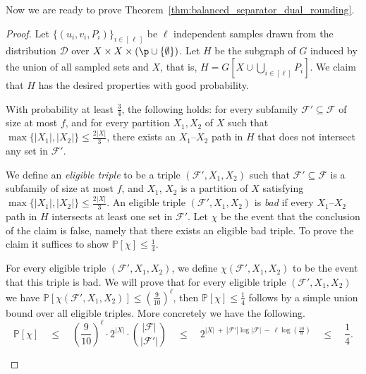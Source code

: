 Now we are ready to prove Theorem~\ref{thm:balanced_separator_dual_rounding}.

\BalancedSeparatorDualRounding*
\begin{proof}
    Let $\{(u_i, v_i, P_i)\}_{i\in[\,\ell\,]}$ be $\ell$ independent samples drawn from the distribution $\mathcal{D}$ over $X\times X\times (\p \cup \{\emptyset\})$. Let $H$ be the subgraph of $G$ induced by the union of all sampled sets and $X$, that is, $H = G[X\cup\bigcup_{i \in [\ell]} P_i]$. We claim that $H$ has the desired properties with good probability.

    \begin{claim}\label{claim:no_balanced_separator}
        With probability at least $\frac{3}{4}$, the following holds: for every subfamily $\mathcal{F}' \subseteq \mathcal{F}$ of size at most $f$, and for every partition $X_1, X_2$ of $X$ such that $\max\{|X_1|, |X_2|\} \leq \frac{2|X|}{3}$, there exists an $X_1$--$X_2$ path in $H$ that does not intersect any set in $\mathcal{F}'$. 
    \end{claim}
    \begin{claimproof}
        We define an {\em eligible triple} to be a triple $(\mathcal{F}', X_1, X_2)$ such that $\mathcal{F}' \subseteq \mathcal{F}$ is a subfamily of size at most $f$, and $X_1$, $X_2$ is a partition of $X$ satisfying $\max\{|X_1|, |X_2|\} \leq \frac{2|X|}{3}$. An eligible triple $(\mathcal{F}', X_1, X_2)$ is {\em bad} if every $X_1$--$X_2$ path in $H$ intersects at least one set in $\mathcal{F}'$. Let $\chi$ be the event that the conclusion of the claim is false, namely that there exists an eligible bad triple. To prove the claim it suffices to show $\mathbb{P}[\chi] \leq \frac{1}{4}$.
        
        For every eligible triple  $(\mathcal{F}', X_1, X_2)$, we define $\chi(\mathcal{F}', X_1, X_2)$ to be the event that this triple is bad. We will prove that for every eligible triple $(\mathcal{F}', X_1, X_2)$ we have $\mathbb{P}[\chi(\mathcal{F}', X_1, X_2)] \leq (\frac{9}{10})^\ell$, then $\mathbb{P}[\chi] \leq \frac{1}{4}$ follows by a simple union bound over all eligible triples. More concretely we have the following.
        $$
            \mathbb{P}\left[\chi\right] \quad \leq \quad \left(\frac{9}{10}\right)^{\ell} \cdot 2^{|X|} \cdot \binom{|\mathcal{F}|}{|\mathcal{F}'|} \quad
            \leq \quad 2^{|X|\ +\ |\mathcal{F}'| \log |\mathcal{F}|\ -\ \ell \log\left(\frac{10}{9}\right)} \quad
            \leq \quad \frac{1}{4}.
        $$
                

\end{claimproof}
\end{proof}
